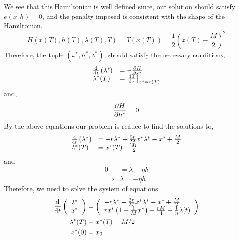 We see that this Hamiltonian is well defined since, our solution should satisfy $e(x,h)=0$, and the penalty imposed is consistent with the shape of the Hamiltonian.
\begin{equation}
	H\left(x(T), h(T), \lambda(T), T \right)=\Upsilon(x(T))=\frac{1}{2}\left(x(T)-\frac{M}{2}\right)^2
\end{equation}
Therefore, the tuple $(x^*, h^*,\lambda^*)$, should satisfy the necessary conditions,
\begin{align}
\begin{array}{ll}
\frac{\mathrm{d} }{{\mathrm{d} t}}\left(\lambda^*\right)&=-\frac{\partial H}{{\partial x^*}} \\
\lambda^*(T)&=\left.\frac{\mathrm{d} \Upsilon}{{\mathrm{d} x}}\right|_{x^*=x(T)}
\end{array}
\end{align}
and,
\begin{align}
\frac{\partial H}{{\partial h^*}}=0
\end{align}
By the above equations our problem is reduce to find the solutions to,
\begin{equation}
\begin{array}{ll}
\frac{\mathrm{d} }{{\mathrm{d} t}}\left(\lambda^*\right)&=-r\lambda^*+\frac{2r}{M}x^*\lambda^* -x^*+\frac{M}{2} \\
\lambda^*(T)&=x^*(T)-\frac{M}{2}
\end{array}	
\end{equation}
and
\begin{align}
	0&=\lambda + \eta h \\
	\implies&\lambda=-\eta h
\end{align}
Therefore, we need to solve the system of equations
\begin{align}
\frac{\mathrm{d} }{{\mathrm{d} t}}\left(\begin{array}{l}
\lambda^*\\x^*
\end{array}\right)&= \left(\begin{array}{l}
-r\lambda^*+\frac{2r}{M}x^*\lambda^*-x^*+\frac{M}{2}\\rx^*\left(1-\frac{1}{M}x^*\right)-\frac{rM}{4}-\frac{1}{\eta} \lambda(t)
\end{array}\right)\label{eq: PontryaginLambdaCondition}\\
\lambda^*(T)&=x^*(T)-M/2\label{eq:PontryaginBoundary}\\
x^*(0)&=x_0 \label{eq:Pontryaginx0}
\end{align}

